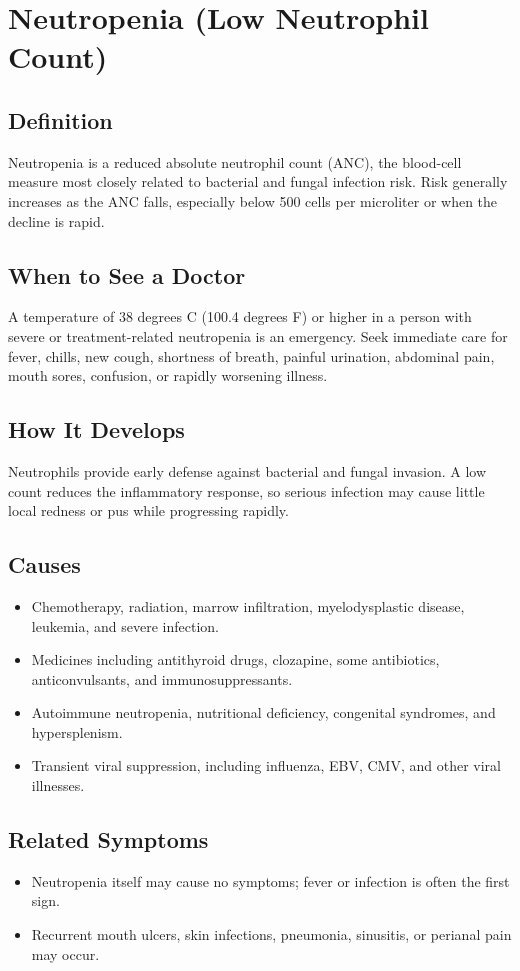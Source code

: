 \chapter{Neutropenia (Low Neutrophil Count)}

\section*{Definition}
Neutropenia is a reduced absolute neutrophil count (ANC), the blood-cell measure most closely related to bacterial and fungal infection risk. Risk generally increases as the ANC falls, especially below 500 cells per microliter or when the decline is rapid.

\section*{When to See a Doctor}
A temperature of 38 degrees C (100.4 degrees F) or higher in a person with severe or treatment-related neutropenia is an emergency. Seek immediate care for fever, chills, new cough, shortness of breath, painful urination, abdominal pain, mouth sores, confusion, or rapidly worsening illness.

\section*{How It Develops}
Neutrophils provide early defense against bacterial and fungal invasion. A low count reduces the inflammatory response, so serious infection may cause little local redness or pus while progressing rapidly.

\section*{Causes}
\begin{itemize}
  \item Chemotherapy, radiation, marrow infiltration, myelodysplastic disease, leukemia, and severe infection.
  \item Medicines including antithyroid drugs, clozapine, some antibiotics, anticonvulsants, and immunosuppressants.
  \item Autoimmune neutropenia, nutritional deficiency, congenital syndromes, and hypersplenism.
  \item Transient viral suppression, including influenza, EBV, CMV, and other viral illnesses.
\end{itemize}

\section*{Related Symptoms}
\begin{itemize}
  \item Neutropenia itself may cause no symptoms; fever or infection is often the first sign.
  \item Recurrent mouth ulcers, skin infections, pneumonia, sinusitis, or perianal pain may occur.
\end{itemize}


